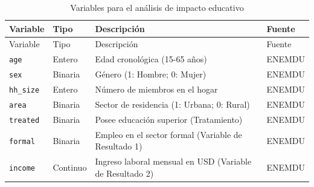 \documentclass[12pt,spanish]{article}
\begin{document}
\begin{longtable}[]{@{}
  >{\raggedright\arraybackslash}p{}
  >{\raggedright\arraybackslash}p{}
  >{\raggedright\arraybackslash}p{}
  >{\raggedright\arraybackslash}p{}@{}}
\caption{Variables para el análisis de impacto
educativo}\label{tbl-vars-edu}\tabularnewline
\toprule\noalign{}
\begin{minipage}[b]{\linewidth}\raggedright
Variable
\end{minipage} & \begin{minipage}[b]{\linewidth}\raggedright
Tipo
\end{minipage} & \begin{minipage}[b]{\linewidth}\raggedright
Descripción
\end{minipage} & \begin{minipage}[b]{\linewidth}\raggedright
Fuente
\end{minipage} \\
\midrule\noalign{}
\endfirsthead
\toprule\noalign{}
\begin{minipage}[b]{\linewidth}\raggedright
Variable
\end{minipage} & \begin{minipage}[b]{\linewidth}\raggedright
Tipo
\end{minipage} & \begin{minipage}[b]{\linewidth}\raggedright
Descripción
\end{minipage} & \begin{minipage}[b]{\linewidth}\raggedright
Fuente
\end{minipage} \\
\midrule\noalign{}
\endhead
\bottomrule\noalign{}
\endlastfoot
\texttt{age} & Entero & Edad cronológica (15-65 años) & ENEMDU \\
\texttt{sex} & Binaria & Género (1: Hombre; 0: Mujer) & ENEMDU \\
\texttt{hh\_size} & Entero & Número de miembros en el hogar & ENEMDU \\
\texttt{area} & Binaria & Sector de residencia (1: Urbana; 0: Rural) &
ENEMDU \\
\texttt{treated} & Binaria & Posee educación superior (Tratamiento) &
ENEMDU \\
\texttt{formal} & Binaria & Empleo en el sector formal (Variable de
Resultado 1) & ENEMDU \\
\texttt{income} & Continuo & Ingreso laboral mensual en USD (Variable de
Resultado 2) & ENEMDU \\
\end{longtable}
\end{document}
